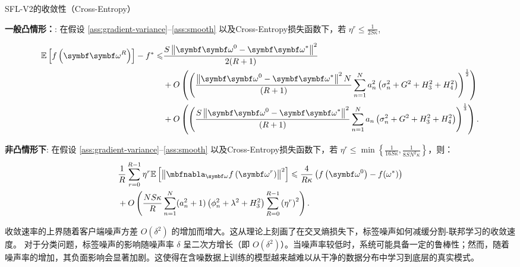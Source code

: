 \begin{theorem}{SFL-V2的收敛性（Cross-Entropy）}\label{theorem-v2-full-ce}

\noindent \textbf{一般凸情形：}:  在假设 \ref{ass:gradient-variance}--\ref{ass:smooth} 以及Cross-Entropy损失函数下，若 $\eta^r \leq \frac{1}{2 S\kappa}$, 

\begin{equation}\label{bound-v2-gc-full-ce}
\begin{aligned}
\mathbb{E}\left[f\left(\boldsymbol{\omegab}^{R}\right)\right]-f^*\le &\frac{S\left\|\boldsymbol{\omegab}^{0}-\boldsymbol{\omegab}^{\ast}\right\|^2}{2(R+1)}\\ 
&+ O\left(\left(\frac{\left\|\boldsymbol{\omegab}^{0}-\boldsymbol{\omegab}^{\ast}\right\|^2 N}{(R+1)}\sum_{n=1}^Na_n^2\left(\sigma_n^2+G^2+H_3^2+H_4^2\right)\right)^{\frac{1}{2}}\right)\\
    &+O\left(\left(\frac{S \left\|\boldsymbol{\omegab}^{0}-\boldsymbol{\omegab}^{\ast}\right\|^2}{(R+1)}\sum_{n=1}^Na_n\left(\sigma_n^2+G^2+H_3^2+H_4^2\right)\right)^{\frac{1}{3}}\right).
\end{aligned}
\end{equation}

\noindent \textbf{非凸情形下}: 在假设 \ref{ass:gradient-variance}--\ref{ass:smooth} 以及Cross-Entropy损失函数下，若 
$\eta^r \leq \min\left\{ \frac{1}{16S\kappa},  \frac{1}{8SN^2\kappa}\right\}$，则：
\begin{equation}\label{bound-v2-nc-full-ce}
\begin{aligned}
&\frac{1}{R}\sum_{r=0}^{R-1}\eta^r\mathbb{E}\left[\left\Vert
\nabla_{\omegab}f\left(\omegab^{r}\right)\right\Vert^2\right]\leq \frac{4}{R\kappa}\left(f\left(\omegab^{0}\right)-f(\omega^*)\right)\\
&+O\left(\frac{NS\kappa }{R} \sum_{n=1}^N(a_n^2+1)\left(\phi_n^2+\lambda^2+H_3^2\right)\sum_{R=0}^{R-1}\left(\eta^r\right)^2\right).
\end{aligned}
\end{equation}
\end{theorem}

收敛速率的上界随着客户端噪声方差 $O(\delta^2)$ 的增加而增大。这从理论上刻画了在交叉熵损失下，标签噪声如何减缓分割-联邦学习的收敛速度。
对于分类问题，标签噪声的影响随噪声率 $\delta$ 呈二次方增长（即 $O(\delta^2)$）。当噪声率较低时，系统可能具备一定的鲁棒性；然而，随着噪声率的增加，其负面影响会显著加剧。这使得在含噪数据上训练的模型越来越难以从干净的数据分布中学习到底层的真实模式。



